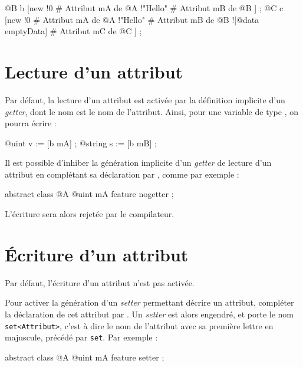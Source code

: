 \begin{galgascode}
@B b [new
  !0 # Attribut mA de @A
  !"Hello" # Attribut mB de @B
] ;
@C c [new
  !0 # Attribut mA de @A
  !"Hello" # Attribut mB de @B
  ![@data emptyData] # Attribut mC de @C
] ;
\end{galgascode}








\section{Lecture d'un attribut}

Par défaut, la lecture d'un attribut est activée par la définition implicite d'un \emph{getter}, dont le nom est le nom de l'attribut. Ainsi, pour une variable  de type , on pourra écrire :

\begin{galgascode}
@uint v := [b mA] ;
@string s := [b mB] ;
\end{galgascode}

Il est possible d'inhiber la génération implicite d'un \emph{getter} de lecture d'un attribut en complétant sa déclaration par , comme par exemple :

\begin{galgascode}
abstract class @A {
  @uint mA feature nogetter ;
}
\end{galgascode}

L'écriture \galgas{[b mA]} sera alors rejetée par le compilateur.









\section{Écriture d'un attribut}

Par défaut, l'écriture d'un attribut n'est pas activée.

Pour activer la génération d'un \emph{setter} permettant décrire un attribut, compléter la déclaration de cet attribut par . Un \emph{setter} est alors engendré, et porte le nom \texttt{set<Attribut>}, c'est à dire le nom de l'attribut avec sa première lettre en majuscule, précédé par \texttt{set}. Par exemple :

\begin{galgascode}
abstract class @A {
  @uint mA feature setter ;
}
\end{galgascode}


